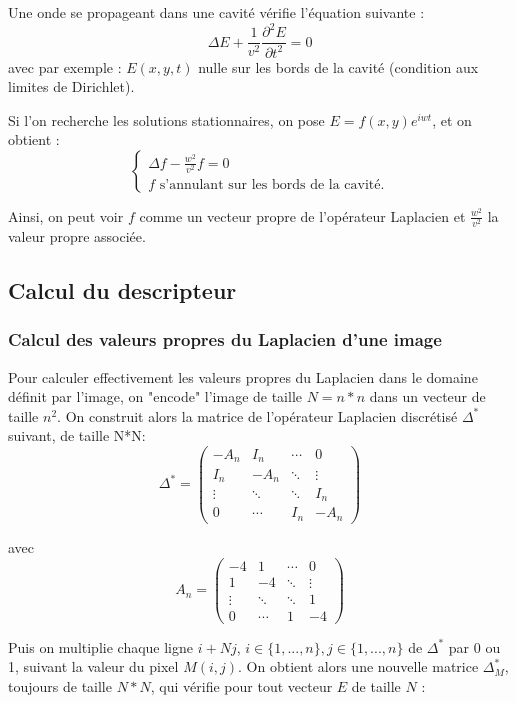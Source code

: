 \documentclass[a4paper,10pt]{article} %
\theoremstyle{definition} %
\begin{document}
Une onde se propageant dans une cavité vérifie l'équation suivante : $$\Delta E + \frac{1}{v^2} \frac{\partial^2 E}{\partial t^2} = 0$$ avec par exemple : $E(x,y,t)$ nulle sur les bords de la cavité (condition aux limites de Dirichlet).

Si l'on recherche les solutions stationnaires, on pose $E = f(x,y)e^{iwt}$, et on obtient : 
\begin{equation}
\left\{ 
  \begin{array}{l}
 \Delta f  - \frac{w^2}{v^2} f = 0 \\
 f  \text{ s'annulant sur les bords de la cavité.} 
   \end{array} \right.
 \label{eigen}
 \end{equation}

Ainsi, on peut voir $f$ comme un vecteur propre de l'opérateur Laplacien et $\frac{w^2}{v^2}$ la valeur propre associée.

\subsection*{Calcul du descripteur}

\subsubsection*{Calcul des valeurs propres du Laplacien d'une image}

Pour calculer effectivement les valeurs propres du Laplacien dans le domaine définit par l'image, on "encode" l'image de taille $N = n*n$ dans un vecteur de taille $n^2$.
On construit alors la matrice de l'opérateur Laplacien discrétisé $\Delta^*$ suivant, de taille N*N: 
$$
\Delta^* =
 \begin{pmatrix}
  -A_n & I_n & \cdots & 0 \\
  I_n & -A_n & \ddots &   \vdots \\
  \vdots  & \ddots  & \ddots & I_n  \\
  0 & \cdots  & I_n & -A_n
 \end{pmatrix}
$$

avec $$A_n =  
\begin{pmatrix}
  -4 & 1 & \cdots & 0 \\
  1  & -4 & \ddots &   \vdots \\
  \vdots  & \ddots  & \ddots & 1  \\
  0 & \cdots  & 1 & -4
 \end{pmatrix}  $$

Puis on multiplie chaque ligne $i+Nj$, $i \in \{1, ..., n\}, j \in \{1, ..., n\}$ de $\Delta^*$ par 0 ou 1, suivant la valeur du pixel $M(i,j)$. On obtient alors une nouvelle matrice $\Delta^*_M$, toujours de taille $N*N$, qui vérifie pour tout vecteur $E$ de taille $N$ : 
\end{document}
